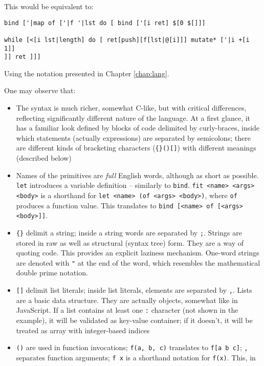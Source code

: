 This would be equivalent to:
\begin{lstlisting}
bind ['|map of ['|f '|lst do [ bind ['[i ret] $[0 $[]]]

while [<[i lst|length] do [ ret[push][f[lst|@[i]]] mutate* ['|i +[i 1]]
]] ret ]]]
\end{lstlisting}

Using the notation presented in Chapter \ref{chap:lang}.

One may observe that:
\begin{itemize}
    \item The syntax is much richer, somewhat C-like, but with critical
    differences, reflecting significantly different nature of the language. At
    a first glance, it has a familiar look defined by blocks of code delimited
    by curly-braces, inside which statements (actually expressions) are
    separated by semicolons; there are different kinds of bracketing
    characters (\texttt{\{\}()[]}) with different meanings (described below)
    \item Names of the primitives are \textit{full} English words, although as
    short as possible. \texttt{let} introduces a variable definition --
    similarly to \texttt{bind}. \texttt{fit <name> <args> <body>} is a
    shorthand for \texttt{let <name> (of <args> <body>)}, where \texttt{of}
    produces a function value. This translates to \texttt{bind [<name> of
        [<args> <body>]]}.
    \item \texttt{\{\}} delimit a string; inside a string words are separated by
    \texttt{;}. Strings are stored in raw as well as structural (syntax tree)
    form. They are a way of quoting code. This provides an explicit laziness
    mechanism. One-word strings are denoted with \texttt{"} at the end of the
    word, which resembles the mathematical double prime notation.
    \item \texttt{[]} delimit list literals; inside list literals, elements are
    separated by \texttt{,}. Lists are a basic data structure. They are
    actually objects, somewhat like in JavaScript. If a list contains at least
    one \texttt{:} character (not shown in the example), it will be validated
    as key-value container; if it doesn't, it will be treated as array with
    integer-based indices
    \item \texttt{()} are used in function invocations; \texttt{f(a, b, c)}
    translates to \texttt{f[a b c]}; \texttt{,} separates function arguments;
    \texttt{f x} is a shorthand notation for \texttt{f(x)}. This, in

\end{itemize}
